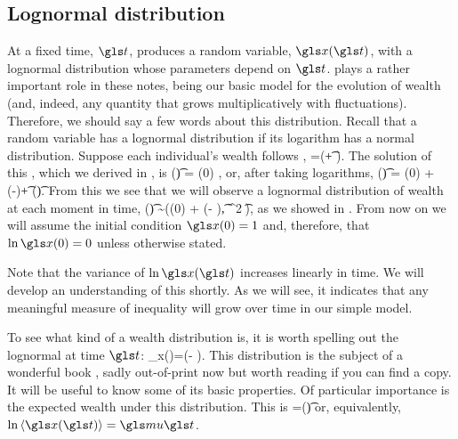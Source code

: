 
\subsection{Lognormal distribution}
At a fixed time, $\t$, \GBM produces a random variable, $\x(\t)$, with a lognormal distribution whose parameters depend on $\t$. \GBM plays a rather important role in these notes, being our basic model for the evolution of wealth (and, indeed, any quantity that grows multiplicatively with fluctuations). Therefore, we should say a few words about this distribution. Recall that a random variable has a lognormal distribution if its logarithm has a normal distribution. Suppose each individual's wealth follows \GBM,
\be
\gd\x=\x(\gmu \gd\t + \gsigma \gd\gW).
\ee
The solution of this \SDE, which we derived in , is
\be
\x(\t) = \x(0) \exp{},
\ee
or, after taking logarithms,
\be
\ln\x(\t) = \ln\x(0) + \left(\gmu-\right)\t + \gsigma \gW(\t).
\ee
From this we see that we will observe a lognormal distribution of wealth at each moment in time,
\be
\ln \x(\t) \sim  \mathcal{\N}\left(\ln \x(0) + \left(\gmu - \right)\t, \gsigma^2 \t\right),
\ee
as we showed in . From now on we will assume the initial condition $\x(0)=1$ and, therefore, that $\ln \x(0)=0$ unless otherwise stated.

Note that the variance of $\ln \x(\t)$ increases linearly in time. We will develop an understanding of this shortly. As we will see, it indicates that any meaningful measure of inequality will grow over time in our simple model.

To see what kind of a wealth distribution  is, it is worth spelling out the lognormal \PDFa at time $\t$:
\be
\PDF_x(\x)=\exp\left(- \right).
\ee
This distribution is the subject of a wonderful book \cite{AitchisonBrown1957}, sadly out-of-print now but worth reading if you can find a copy. It will be useful to know some of its basic properties. Of particular importance is the expected wealth under this distribution. This is
\be
\ave{\x(\t)}=\exp(\gmu \t)
\ee
or, equivalently, $\ln\ave{\x(\t)}=\gmu \t$.

